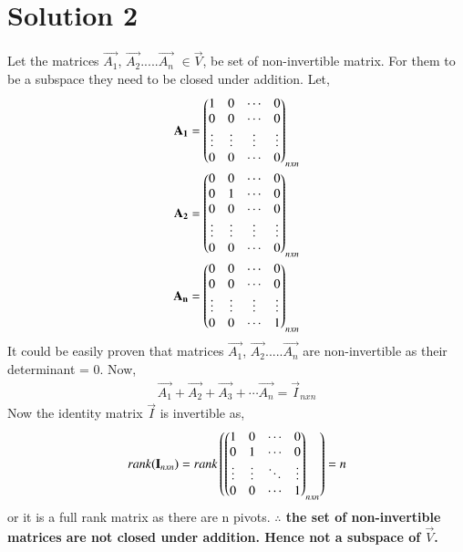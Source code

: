 \documentclass[journal,12pt,twocolumn]{IEEEtran}
\begin{document}
\section{Solution 2}
Let the matrices $\vec{A_1}$, $\vec{A_2}$.....$\vec{A_n}$ $\in \vec{V}$, be set of non-invertible matrix. For them to be a subspace they need to be closed under addition. Let,
\begin{align}
\mathbf{A_1} = \begin{pmatrix}1&0&\cdots&0\\0&0&\cdots&0\\\vdots&\vdots&\vdots&\vdots\\0&0&\cdots&0\end{pmatrix}_{nxn}\\
\mathbf{A_2} = \begin{pmatrix}0&0&\cdots&0\\0&1&\cdots&0\\0&0&\cdots&0\\\vdots&\vdots&\vdots&\vdots\\0&0&\cdots&0\end{pmatrix}_{nxn}\\
\mathbf{A_n}=\begin{pmatrix}0&0&\cdots&0\\0&0&\cdots&0\\\vdots&\vdots&\vdots&\vdots\\0&0&\cdots&1\end{pmatrix}_{nxn}\\
\end{align}  
It could be easily proven that matrices $\vec{A_1}$, $\vec{A_2}$.....$\vec{A_n}$ are non-invertible as their determinant = 0. Now,
\begin{align}
\vec{A_1}+\vec{A_2}+\vec{A_3}+\cdots\vec{A_n} = \vec{I}_{nxn}
\end{align}
Now the identity matrix $\vec{I}$ is invertible as,
\begin{align}
rank(\mathbf{I}_{nxn}) = rank\left(\begin{pmatrix}1&0&\cdots&0\\0&1&\cdots&0\\\vdots&\vdots&\ddots&\vdots\\0&0&\cdots&1\end{pmatrix}_{nxn}\right)= n
\end{align} 
or it is a full rank matrix as there are n pivots. \textbf{$\therefore$ the set of non-invertible matrices are not closed under addition. Hence not a subspace of $\vec{V}$.}
\end{document}
